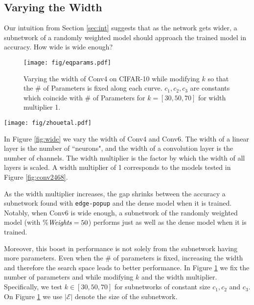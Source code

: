 \documentclass[10pt,twocolumn,letterpaper]{article}
\newcommand*{\E}{\mathcal{E}}
\newcommand{\alg}{\texttt{edge-popup} }
\begin{document}
\subsection{Varying the Width}

Our intuition from Section \ref{sec:int} suggests that as the network gets wider, a subnetwork of a randomly weighted model should approach the trained model in accuracy. How wide is wide enough? 
\begin{figure}[h]
    \centering
    \texttt{[image: fig/eqparams.pdf]}
    \caption{Varying the width of Conv4  on CIFAR-10 \cite{cifar} while modifying $k$ so that the \# of Parameters is fixed along each curve. $c_1,c_2, c_3$ are constants which coincide with \# of Parameters for $k=[30,50,70]$ for width multiplier 1.}
    \label{fig:eqparams}
\end{figure}

\begin{figure*}[t!]
    \centering
    \texttt{[image: fig/zhouetal.pdf]}
    \caption{Comparing the performance of \alg with the algorithm presented by Zhou \etal \cite{supermask} on CIFAR-10 \cite{cifar}.}
    \label{fig:zhou}
\end{figure*}

In Figure \ref{fig:wide} we vary the width of Conv4 and Conv6.  The width of a linear layer is the number of ``neurons", and the width of a convolution layer is the number of channels. The width multiplier is the factor by which the width of all layers is scaled. A width multiplier of 1 corresponds to the models tested in Figure \ref{fig:conv2468}.

As the width multiplier increases, the gap shrinks between the accuracy a subnetwork found with \alg and the dense model when it is trained. Notably, when Conv6 is wide enough, a subnetwork of the randomly weighted model (with $\% \textrm{\textit{Weights}} = 50$) performs just as well as the dense model when it is trained. 

Moreover, this boost in performance is not solely from the subnetwork having more parameters. Even when the \# of parameters is fixed, increasing the width and therefore the search space leads to better performance. In Figure \ref{fig:eqparams} we fix the number of parameters and while modifying $k$ and the width multiplier. Specifically, we test $k \in [30, 50, 70]$ for subnetworks of constant size $c_1, c_2$ and $c_3$. On Figure \ref{fig:eqparams} we use $|\E|$ denote the size of the subnetwork.
\end{document}
